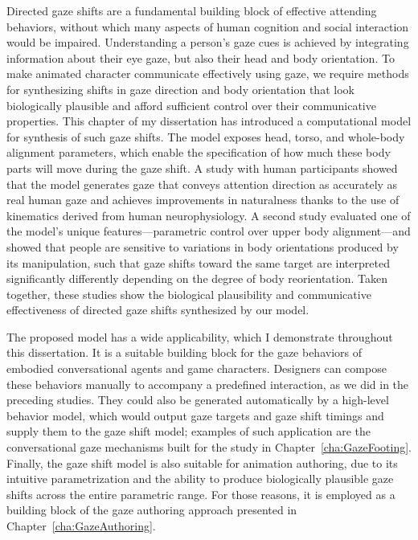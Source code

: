 Directed gaze shifts are a fundamental building block of effective attending behaviors, without which many aspects of human cognition and social interaction would be impaired. Understanding a person's gaze cues is achieved by integrating information about their eye gaze, but also their head and body orientation. To make animated character communicate effectively using gaze, we require methods for synthesizing shifts in gaze direction and body orientation that look biologically plausible and afford sufficient control over their communicative properties. This chapter of my dissertation has introduced a computational model for synthesis of such gaze shifts. The model exposes head, torso, and whole-body alignment parameters, which enable the specification of how much these body parts will move during the gaze shift. A study with human participants showed that the model generates gaze that conveys attention direction as accurately as real human gaze and achieves improvements in naturalness thanks to the use of kinematics derived from human neurophysiology. A second study evaluated one of the model's unique features---parametric control over upper body alignment---and showed that people are sensitive to variations in body orientations produced by its manipulation, such that gaze shifts toward the same target are interpreted significantly differently depending on the degree of body reorientation. Taken together, these studies show the biological plausibility and communicative effectiveness of directed gaze shifts synthesized by our model.

The proposed model has a wide applicability, which I demonstrate throughout this dissertation. It is a suitable building block for the gaze behaviors of embodied conversational agents and game characters. Designers can compose these behaviors manually to accompany a predefined interaction, as we did in the preceding studies. They could also be generated automatically by a high-level behavior model, which would output gaze targets and gaze shift timings and supply them to the gaze shift model; examples of such application are the conversational gaze mechanisms built for the study in Chapter~\ref{cha:GazeFooting}. Finally, the gaze shift model is also suitable for animation authoring, due to its intuitive parametrization and the ability to produce biologically plausible gaze shifts across the entire parametric range. For those reasons, it is employed as a building block of the gaze authoring approach presented in Chapter~\ref{cha:GazeAuthoring}.

